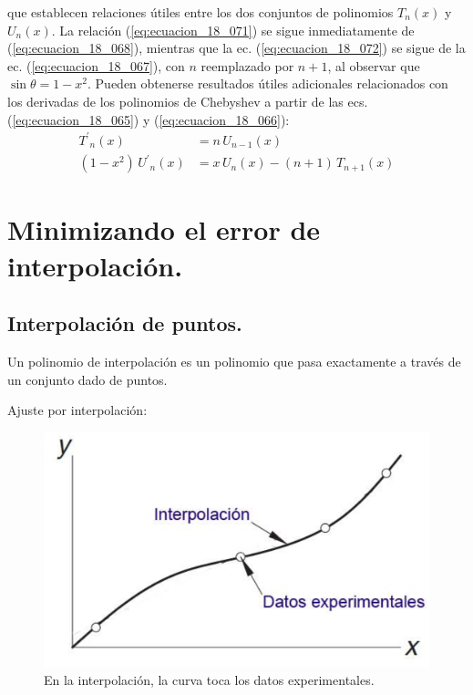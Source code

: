 \documentclass[12pt]{article}
\newcommand{\pderivada}[1]{\ensuremath{{#1}^{\prime}}}
\numberwithin{equation}{section}
\begin{document}
que establecen relaciones útiles entre los dos conjuntos de polinomios $T_{n} (x)$ y $U_{n} (x)$. La relación (\ref{eq:ecuacion_18_071}) se sigue inmediatamente de (\ref{eq:ecuacion_18_068}), mientras que la ec. (\ref{eq:ecuacion_18_072}) se sigue de la ec. (\ref{eq:ecuacion_18_067}), con $n$ reemplazado por $n + 1$, al observar que $\sin \theta = 1 - x^{2}$. Pueden obtenerse resultados útiles adicionales relacionados con los derivadas de los polinomios de Chebyshev a partir de las ecs. (\ref{eq:ecuacion_18_065}) y (\ref{eq:ecuacion_18_066}):
\begin{align*}
\pderivada{T}_{n} (x) &= n \, U_{n-1} (x) \\[0.5em]
(1 - x^{2}) \, \pderivada{U}_{n} (x) &= x \, U_{n} (x) - (n + 1) \, T_{n+1} (x)
\end{align*}

\section{Minimizando el error de interpolación.}

\subsection{Interpolación de puntos.}

Un polinomio de interpolación es un polinomio que pasa exactamente a través de un conjunto dado de puntos.
\par
Ajuste por interpolación:
\begin{figure}[H]
   \centering
   \includegraphics[scale=0.5]{Imagenes/Interpol02.eps}
   \caption{En la interpolación, la curva toca los datos experimentales.}
\end{figure}
\end{document}
